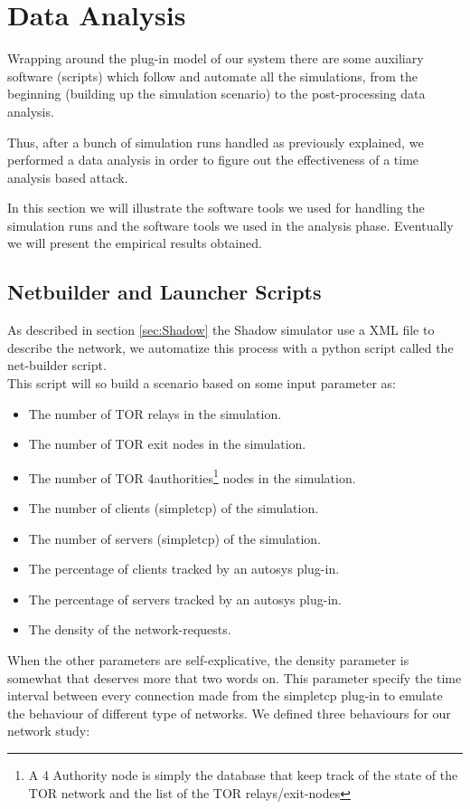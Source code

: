 \section{Data Analysis}
Wrapping around the plug-in model of our system there are some auxiliary
software (scripts)
which follow and automate all the simulations, from the beginning (building up
the simulation scenario) to the post-processing data analysis.

Thus, after a bunch of simulation runs handled as previously explained,
 we performed a data analysis in order to
figure out the effectiveness of a time analysis based attack.  

In this section we will illustrate the software tools we used for
handling the
simulation runs and the software tools we used in the analysis phase. 
Eventually we will 
present the empirical results
obtained.
\subsection{Netbuilder and Launcher Scripts}
\label{sec:netbuilder}
As described in section \ref{sec:Shadow}
the Shadow simulator use a XML file to describe the network,
we automatize this process with a python script called the net-builder script.\\
This script will so build a scenario based on some input parameter as:
\begin{itemize}
\item The number of TOR relays in the simulation.
\item The number of TOR exit nodes in the simulation.
\item The number of TOR 4authorities\footnote{A 4 Authority node is simply the
database that keep track of the state of the TOR network and the list
of the TOR relays/exit-nodes} nodes in the simulation.
\item The number of clients (simpletcp) of the simulation.
\item The number of servers (simpletcp) of the simulation.
\item The percentage of clients tracked by an autosys plug-in.
\item The percentage of servers tracked by an autosys plug-in.
\item The density of the network-requests.
\end{itemize}

When the other parameters are self-explicative, the density parameter is somewhat
that deserves more that two words on.
This parameter specify the time interval between every connection made from the
simpletcp plug-in to emulate the behaviour of different type of networks.
We defined three behaviours for our network study:

